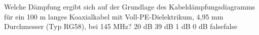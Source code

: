     {Welche Dämpfung ergibt sich auf der Grundlage des Kabeldämpfungsdiagramms für ein 100 m langes Koaxialkabel mit Voll-PE-Dielektrikum, 4,95 mm Durchmesser (Typ RG58), bei 145 MHz?}
    {20 dB}
    {39 dB}
    {1 dB}
    {0 dB}
    {false}{false}
